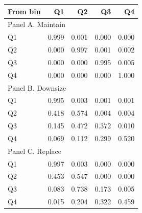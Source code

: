 \begin{tabular}{lrrrr}
\toprule
From bin & Q1 & Q2 & Q3 & Q4 \\
\midrule
\multicolumn{5}{l}{Panel A. Maintain} \\
\midrule
Q1 & 0.999 & 0.001 & 0.000 & 0.000 \\
Q2 & 0.000 & 0.997 & 0.001 & 0.002 \\
Q3 & 0.000 & 0.000 & 0.995 & 0.005 \\
Q4 & 0.000 & 0.000 & 0.000 & 1.000 \\
\multicolumn{5}{l}{Panel B. Downsize} \\
\midrule
Q1 & 0.995 & 0.003 & 0.001 & 0.001 \\
Q2 & 0.418 & 0.574 & 0.004 & 0.004 \\
Q3 & 0.145 & 0.472 & 0.372 & 0.010 \\
Q4 & 0.069 & 0.112 & 0.299 & 0.520 \\
\multicolumn{5}{l}{Panel C. Replace} \\
\midrule
Q1 & 0.997 & 0.003 & 0.000 & 0.000 \\
Q2 & 0.453 & 0.547 & 0.000 & 0.000 \\
Q3 & 0.083 & 0.738 & 0.173 & 0.005 \\
Q4 & 0.015 & 0.204 & 0.322 & 0.459 \\
\bottomrule
\end{tabular}

